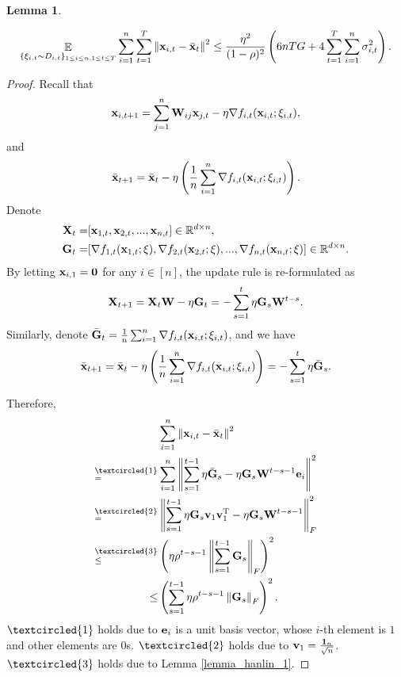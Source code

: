 \documentclass{article}
\newtheorem{Lemma}{\bf{Lemma}}
\begin{document}
\begin{Lemma}
\label{lemma_x_variance_norm_square}

\begin{align}
\nonumber
\mathop{\mathbb{E}}_{ \{ \xi_{i,t} \sim D_{i,t} \}_{1\le i \le n,1\le t \le T} } \sum_{i=1}^n\sum_{t=1}^T \left\lVert{\bf x}_{i,t} - \bar{{\bf x}}_t\right\rVert^2 \le \frac{\eta^2}{(1-\rho)^2}   \left(  6nTG + 4\sum_{t=1}^T\sum_{i=1}^n \sigma_{i,t}^2  \right).
\end{align}

\end{Lemma}
\begin{proof}


Recall that 
\begin{align}
\nonumber
{\bf x}_{i,t+1} = \sum_{j=1}^n {\bf W}_{ij}{\bf x}_{j,t} - \eta \nabla f_{i,t}({\bf x}_{i,t};\xi_{i,t}),
\end{align} and 
\begin{align}
\nonumber
\bar{{\bf x}}_{t+1} = \bar{{\bf x}}_t - \eta \left( \frac{1}{n}\sum_{i=1}^n \nabla f_{i,t}({\bf x}_{i,t};\xi_{i,t}) \right).
\end{align} Denote 
\begin{align}
\nonumber
{\bf X}_t = &  [{\bf x}_{1,t}, {\bf x}_{2,t}, ..., {\bf x}_{n,t}] \in \mathbb{R}^{d\times n}, \\ \nonumber
{\bf G}_t = & [\nabla f_{1,t}({\bf x}_{1,t};\xi), \nabla f_{2,t}({\bf x}_{2,t};\xi), ..., \nabla f_{n,t}({\bf x}_{n,t};\xi)] \in \mathbb{R}^{d\times n}.
\end{align} By letting ${\bf x}_{i,1} = {\bf 0}$ for any $i\in[n]$, the update rule is re-formulated as 
\begin{align}
\nonumber
{\bf X}_{t+1} = {\bf X}_t {\bf W} - \eta {\bf G}_t = - \sum_{s=1}^t \eta {\bf G}_s {\bf W}^{t-s}. 
\end{align} Similarly, denote $\bar{{\bf G}}_t = \frac{1}{n}\sum_{i=1}^n \nabla f_{i,t}({\bf x}_{i,t};\xi_{i,t})$, and we have
\begin{align}
\bar{{\bf x}}_{t+1} = \bar{{\bf x}}_t - \eta \left( \frac{1}{n}\sum_{i=1}^n \nabla f_{i,t}({\bf x}_{i,t};\xi_{i,t}) \right) = - \sum_{s=1}^t \eta \bar{{\bf G}}_s. 
\end{align}


Therefore, 
\begin{align}
\nonumber
& \sum_{i=1}^n \lrnorm{\x_{i,t} - \bar{\x}_t}^2 \\ \nonumber
\refabovecir{=}{\textcircled{1}} & \sum_{i=1}^n \lrnorm{ \sum_{s=1}^{t-1} \eta \bar{\G}_s - \eta \G_s \W^{t-s-1}\e_i }^2   \\ \nonumber
\refabovecir{=}{\textcircled{2}} & \lrnorm{ \sum_{s=1}^{t-1} \eta \G_s\v_1 \v_1\Tr - \eta \G_s \W^{t-s-1} }^2_F   \\ \nonumber
\refabovecir{\le}{\textcircled{3}} & \lrincir{ \eta \rho^{t-s-1} \lrnorm{\sum_{s=1}^{t-1}\G_s}_F}^2 \\ \nonumber
\le & \lrincir{ \sum_{s=1}^{t-1} \eta \rho^{t-s-1} \lrnorm{\G_s}_F}^2.
\end{align} $\textcircled{1}$ holds due to ${\bf e}_i$ is a unit basis vector, whose $i$-th element is $1$ and other elements are $0$s. $\textcircled{2}$ holds due to ${\bf v}_1 = \frac{{\bf 1}_n}{\sqrt{n}}$. $\textcircled{3}$ holds due to Lemma \ref{lemma_hanlin_1}. 



\end{proof}
\end{document}
